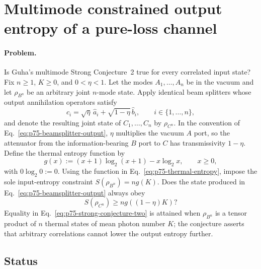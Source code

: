 \section{Multimode constrained output entropy of a pure-loss channel}
\label{sec:op_3cd14aef409b226b}

\paragraph{Problem.}
Is Guha's multimode Strong Conjecture~2 true for every correlated input state?
Fix $n\geq1$, $K\geq0$, and $0<\eta<1$.  Let the modes
$A_1,\ldots,A_n$ be in the vacuum and let $\rho_{B^n}$ be an arbitrary joint
$n$-mode state.  Apply identical beam splitters whose output annihilation
operators satisfy
\begin{equation}
  \hat c_i=\sqrt{\eta}\,\hat a_i
    +\sqrt{1-\eta}\,\hat b_i,
  \qquad i\in\{1,\ldots,n\},
  \label{eq:p75-beamsplitter-output}
\end{equation}
and denote the resulting joint state of $C_1,\ldots,C_n$ by
$\rho_{C^n}$.  In the convention of Eq.~\eqref{eq:p75-beamsplitter-output},
$\eta$ multiplies the vacuum $A$ port, so the attenuator from the
information-bearing $B$ port to $C$ has transmissivity $1-\eta$.  Define the
thermal entropy function by
\begin{equation}
  g(x):=(x+1)\log_2(x+1)-x\log_2x,
  \qquad x\geq0,
  \label{eq:p75-thermal-entropy}
\end{equation}
with $0\log_2 0:=0$.  Using the function in
Eq.~\eqref{eq:p75-thermal-entropy}, impose the sole
input-entropy constraint $S(\rho_{B^n})=ng(K)$.  Does the state produced in
Eq.~\eqref{eq:p75-beamsplitter-output} always obey
\begin{equation}
  S(\rho_{C^n})\geq ng((1-\eta)K)?
  \label{eq:p75-strong-conjecture-two}
\end{equation}
Equality in Eq.~\eqref{eq:p75-strong-conjecture-two} is attained when
$\rho_{B^n}$ is a tensor product of $n$ thermal states of mean photon number
$K$; the conjecture asserts that arbitrary correlations cannot lower the
output entropy further.

\subsection*{Status}

